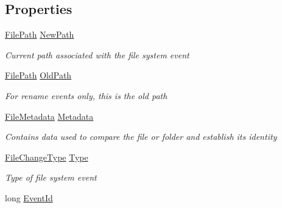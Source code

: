 \subsection*{Properties}
\begin{DoxyCompactItemize}
\item 
\hyperlink{class_cloud_api_public_1_1_model_1_1_file_path}{File\-Path} \hyperlink{class_cloud_api_public_1_1_model_1_1_file_change_ad7383c43cc51606f17c63fad6c032c7c}{New\-Path}
\begin{DoxyCompactList}\small\item\em Current path associated with the file system event \end{DoxyCompactList}\item 
\hyperlink{class_cloud_api_public_1_1_model_1_1_file_path}{File\-Path} \hyperlink{class_cloud_api_public_1_1_model_1_1_file_change_a08ced19e1fccebb04bf6da37f21a4216}{Old\-Path}
\begin{DoxyCompactList}\small\item\em For rename events only, this is the old path \end{DoxyCompactList}\item 
\hyperlink{class_cloud_api_public_1_1_model_1_1_file_metadata}{File\-Metadata} \hyperlink{class_cloud_api_public_1_1_model_1_1_file_change_ae4e797c6b4b11f9686e4cb1318dab9a5}{Metadata}
\begin{DoxyCompactList}\small\item\em Contains data used to compare the file or folder and establish its identity \end{DoxyCompactList}\item 
\hyperlink{namespace_cloud_api_public_1_1_static_a08ff1fddb1dc38f7b861b0fd106834be}{File\-Change\-Type} \hyperlink{class_cloud_api_public_1_1_model_1_1_file_change_a6a1aeec98ba00f051497c5126adf69a4}{Type}
\begin{DoxyCompactList}\small\item\em Type of file system event \end{DoxyCompactList}\item 
long \hyperlink{class_cloud_api_public_1_1_model_1_1_file_change_aef22ff9ac6993f82e3612d05f093e836}{Event\-Id}

\end{DoxyCompactItemize}
